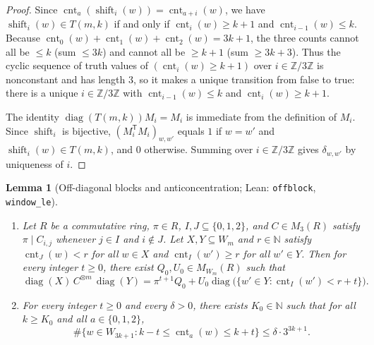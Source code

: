 \documentclass[11pt]{article}
\newtheorem{lemma}[theorem]{Lemma}
\theoremstyle{definition}
\theoremstyle{remark}
\numberwithin{equation}{section}
\DeclareMathOperator{\diag}{diag}
\DeclareMathOperator{\cnt}{cnt}
\newcommand{\Z}{\mathbb{Z}}
\newcommand{\N}{\mathbb{N}}
\newcommand{\1}{\mathbf{1}}
\newcommand{\code}[1]{{\normalfont\small\texttt{#1}}}
\begin{document}
\begin{proof}
Since $\cnt_a(\operatorname{shift}_i(w)) = \cnt_{a + i}(w)$, we have $\operatorname{shift}_i(w) \in T(m, k)$ if and only if $\cnt_i(w) \ge k + 1$ and $\cnt_{i - 1}(w) \le k$. Because $\cnt_0(w) + \cnt_1(w) + \cnt_2(w) = 3k + 1$, the three counts cannot all be $\le k$ (sum $\le 3k$) and cannot all be $\ge k + 1$ (sum $\ge 3k + 3$). Thus the cyclic sequence of truth values of $(\cnt_i(w) \ge k + 1)$ over $i \in \Z/3\Z$ is nonconstant and has length $3$, so it makes a unique transition from false to true: there is a unique $i \in \Z/3\Z$ with $\cnt_{i-1}(w) \le k$ and $\cnt_i(w) \ge k + 1$.

The identity $\diag(T(m, k)) M_i = M_i$ is immediate from the definition of $M_i$. Since $\operatorname{shift}_i$ is bijective, $(M_i^\mathsf{T} M_i)_{w, w'}$ equals $1$ if $w = w'$ and $\operatorname{shift}_i(w) \in T(m, k)$, and $0$ otherwise. Summing over $i \in \Z/3\Z$ gives $\delta_{w, w'}$ by uniqueness of $i$.
\end{proof}

\begin{lemma}[Off-diagonal blocks and anticoncentration; Lean: \code{offblock}, \code{window\_le}]
\label{lem:offblock-anti}
\leavevmode
\begin{enumerate}[label=\textup{(\alph*)},leftmargin=2.2em]
\item Let $R$ be a commutative ring, $\pi \in R$, $I, J \subseteq \{0,1,2\}$, and $C \in M_3(R)$ satisfy $\pi \mid C_{i,j}$ whenever $j \in I$ and $i \notin J$. Let $X, Y \subseteq W_m$ and $r \in \N$ satisfy $\cnt_J(w) < r$ for all $w \in X$ and $\cnt_I(w') \ge r$ for all $w' \in Y$. Then for every integer $t \ge 0$, there exist $Q_0, U_0 \in M_{W_m}(R)$ such that
\[
\diag(X)\, C^{\otimes m}\, \diag(Y) = \pi^{t+1} Q_0 + U_0 \diag\bigl(\{w' \in Y : \cnt_I(w') < r + t\}\bigr).
\]
\item For every integer $t \ge 0$ and every $\delta > 0$, there exists $K_0 \in \N$ such that for all $k \ge K_0$ and all $a \in \{0, 1, 2\}$,
\[
\#\bigl\{w \in W_{3k+1} : k - t \le \cnt_a(w) \le k + t\bigr\} \le \delta \cdot 3^{3k+1}.
\]
\end{enumerate}
\end{lemma}
\end{document}
